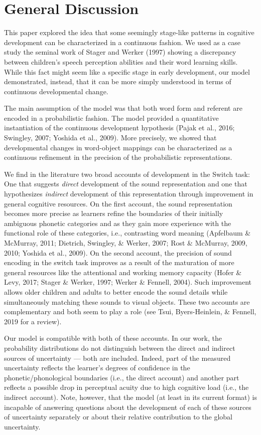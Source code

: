 \documentclass[english,,man,floatsintext]{apa6}
\theoremstyle{definition}
\theoremstyle{definition}
\theoremstyle{definition}
\theoremstyle{remark}
\begin{document}
\section{General Discussion}\label{general-discussion}

This paper explored the idea that some seemingly stage-like patterns in
cognitive development can be characterized in a continuous fashion. We
used as a case study the seminal work of Stager and Werker (1997)
showing a discrepancy between children's speech perception abilities and
their word learning skills. While this fact might seem like a specific
stage in early development, our model demonstrated, instead, that it can
be more simply understood in terms of continuous developmental change.

The main assumption of the model was that both word form and referent
are encoded in a probabilistic fashion. The model provided a
quantitative instantiation of the continuous development hypothesis
(Pajak et al., 2016; Swingley, 2007; Yoshida et al., 2009). More
precisely, we showed that developmental changes in word-object mappings
can be characterized as a continuous refinement in the precision of the
probabilistic representations.

We find in the literature two broad accounts of development in the
Switch task: One that suggests \emph{direct} development of the sound
representation and one that hypothesizes \emph{indirect} development of
this representation through improvement in general cognitive resources.
On the first account, the sound representation becomes more precise as
learners refine the boundaries of their initially ambiguous phonetic
categories and as they gain more experience with the functional role of
these categories, i.e., contrasting word meaning (Apfelbaum \& McMurray,
2011; Dietrich, Swingley, \& Werker, 2007; Rost \& McMurray, 2009, 2010;
Yoshida et al., 2009). On the second account, the precision of sound
encoding in the switch task improves as a result of the maturation of
more general resources like the attentional and working memory capacity
(Hofer \& Levy, 2017; Stager \& Werker, 1997; Werker \& Fennell, 2004).
Such improvement allows older children and adults to better encode the
sound details while simultaneously matching these sounds to visual
objects. These two accounts are complementary and both seem to play a
role (see Tsui, Byers-Heinlein, \& Fennell, 2019 for a review).

Our model is compatible with both of these accounts. In our work, the
probability distributions do not distinguish between the direct and
indirect sources of uncertainty --- both are included. Indeed, part of
the measured uncertainty reflects the learner's degrees of confidence in
the phonetic/phonological boundaries (i.e., the direct account) and
another part reflects a possible drop in perceptual acuity due to high
cognitive load (i.e., the indirect account). Note, however, that the
model (at least in its current format) is incapable of answering
questions about the development of each of these sources of uncertainty
separately or about their relative contribution to the global
uncertainty.
\end{document}
